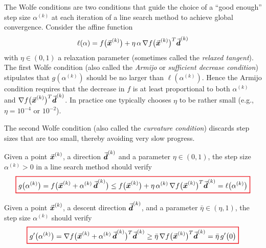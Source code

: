 The Wolfe conditions are two conditions that guide the choice of a “good enough” step size \(\alpha^{(k)}\) at each iteration of a line search method to achieve global convergence. Consider the affine function
\[
\ell(\alpha) = f\bigl(\vect{x}^{(k)}\bigr) + \eta\,\alpha\, \nabla f\bigl(\vect{x}^{(k)}\bigr)^T \vect{d}^{(k)} %
\]
with \(\eta \in (0,1)\) a relaxation parameter (sometimes called the \emph{relaxed tangent}). The first Wolfe condition (also called the \emph{Armijo} or \emph{sufficient decrease condition}) stipulates that \(g(\alpha^{(k)})\) should be no larger than \(\ell(\alpha^{(k)})\).
Hence the Armijo condition requires that the decrease in \(f\) is at least proportional to both \(\alpha^{(k)}\) and \(\nabla f\bigl(\vec{\boldsymbol{x}}^{(k)}\bigr)^T \vec{\boldsymbol{d}}^{(k)}\). In practice one typically chooses \(\eta\) to be rather small (e.g., \(\eta = 10^{-4}\) or \(10^{-2}\)).

The second Wolfe condition (also called the \emph{curvature condition}) discards step sizes that are too small, thereby avoiding very slow progress.

\begin{definition}
\label{def:first_wolfe_condition}
Given a point \(\vec{\boldsymbol{x}}^{(k)}\), a direction \(\vec{\boldsymbol{d}}^{(k)}\) and a parameter \(\eta \in (0,1)\), the step size \(\alpha^{(k)}>0\) in a line search method should verify
\begin{equation}
\label{eq:first_wolfe_condition}
{\color{Red}
\setlength{\fboxrule}{1pt}
\boxed{ 
\color{black}
g\bigl(\alpha^{(k)}\bigr) 
=
f\bigl(\vect{x}^{(k)} + \alpha^{(k)}\,\vect{d}^{(k)}\bigr) 
\le 
f\bigl(\vect{x}^{(k)}\bigr) + \eta\, \alpha^{(k)}\, \nabla f\bigl(\vect{x}^{(k)}\bigr)^T \vect{d}^{(k)} 
= 
\ell\bigl(\alpha^{(k)}\bigr) %
}
}
\end{equation}
\end{definition}

\begin{definition}
\label{def:second_wolfe_condition}
Given a point \(\vec{\boldsymbol{x}}^{(k)}\), a descent direction \(\vec{\boldsymbol{d}}^{(k)}\), and a parameter \(\bar{\eta} \in (\eta, 1)\), the step size \(\alpha^{(k)}\) should verify
\begin{equation}
\label{eq:second_wolfe_condition}
{\color{Red}
\setlength{\fboxrule}{1pt}
\boxed{ 
\color{black}
g'\bigl(\alpha^{(k)}\bigr) 
= 
\nabla f\bigl(\vect{x}^{(k)} + \alpha^{(k)}\,\vect{d}^{(k)}\bigr)^T \vect{d}^{(k)} 
\ge 
\bar{\eta}\, \nabla f\bigl(\vect{x}^{(k)}\bigr)^T \vect{d}^{(k)}
=
\bar{\eta}\,g'\bigl(0\bigr)
}
}
\end{equation}
\end{definition}

